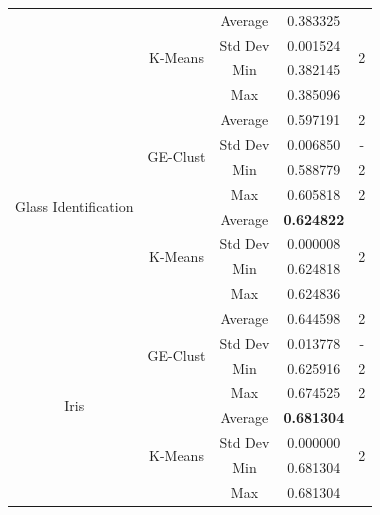 \documentclass[conference]{IEEEtran}
\begin{document}
\begin{table}[!htb]
\begin{tabular}{|c|c|c|c|c|}
			& \multirow{4}{*}{K-Means}  & Average             & 0.383325          & \multirow{4}{*}{2} \\ \cline{3-4}
			&                           & Std Dev             & 0.001524          &                    \\ \cline{3-4}
			&                           & Min                 & 0.382145          &                    \\ \cline{3-4}
			&                           & Max                 & 0.385096          &                    \\ \hline
			\multirow{8}{*}{Glass Identification}                                            & \multirow{4}{*}{GE-Clust} & Average             & 0.597191          & 2                  \\ \cline{3-5} 
			&                           & Std Dev             & 0.006850          & -                  \\ \cline{3-5} 
			&                           & Min                 & 0.588779          & 2                  \\ \cline{3-5} 
			&                           & Max                 & 0.605818          & 2                  \\ \cline{2-5} 
			& \multirow{4}{*}{K-Means}  & Average             & \textbf{0.624822} & \multirow{4}{*}{2} \\ \cline{3-4}
			&                           & Std Dev             & 0.000008          &                    \\ \cline{3-4}
			&                           & Min                 & 0.624818          &                    \\ \cline{3-4}
			&                           & Max                 & 0.624836          &                    \\ \hline
			\multirow{8}{*}{Iris}                                                            & \multirow{4}{*}{GE-Clust} & Average             & 0.644598          & 2                  \\ \cline{3-5} 
			&                           & Std Dev             & 0.013778          & -                  \\ \cline{3-5} 
			&                           & Min                 & 0.625916          & 2                  \\ \cline{3-5} 
			&                           & Max                 & 0.674525          & 2                  \\ \cline{2-5} 
			& \multirow{4}{*}{K-Means}  & Average             & \textbf{0.681304} & \multirow{4}{*}{2} \\ \cline{3-4}
			&                           & Std Dev             & 0.000000          &                    \\ \cline{3-4}
			&                           & Min                 & 0.681304          &                    \\ \cline{3-4}
			&                           & Max                 & 0.681304          &                    \\ \hline
		\end{tabular}
	\end{table}
	
\end{document}
